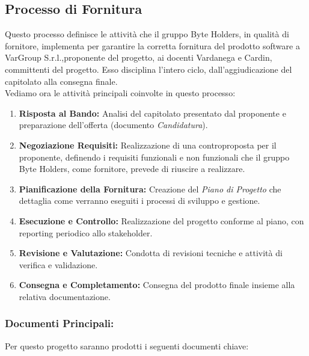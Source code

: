 \documentclass[a4paper, 11pt]{article}
\begin{document}
\subsection{Processo di Fornitura}
Questo processo definisce le attività che il gruppo Byte Holders, in qualità di fornitore, implementa per garantire la corretta fornitura del prodotto software a VarGroup S.r.l.,proponente del progetto, ai docenti Vardanega e Cardin, committenti del progetto. 
Esso disciplina l'intero ciclo, dall'aggiudicazione del capitolato alla consegna finale.
\\
Vediamo ora le attività principali coinvolte in questo processo:
\begin{enumerate}
    \item \textbf{Risposta al Bando:} Analisi del capitolato presentato dal proponente e preparazione dell'offerta (documento \textit{Candidatura}).
    \item \textbf{Negoziazione Requisiti:} Realizzazione di una controproposta per il proponente, definendo i requisiti funzionali e non funzionali che il gruppo Byte Holders, come fornitore, prevede di riuscire a realizzare.
    \item \textbf{Pianificazione della Fornitura:} Creazione del \textit{Piano di Progetto} che dettaglia come verranno eseguiti i processi di sviluppo e gestione.
    \item \textbf{Esecuzione e Controllo:} Realizzazione del progetto conforme al piano, con reporting periodico allo stakeholder.
    \item \textbf{Revisione e Valutazione:} Condotta di revisioni tecniche e attività di verifica e validazione.
    \item \textbf{Consegna e Completamento:} Consegna del prodotto finale insieme alla relativa documentazione.
\end{enumerate}
\subsubsection{Documenti Principali:} 
Per questo progetto saranno prodotti i seguenti documenti chiave:


\end{document}

